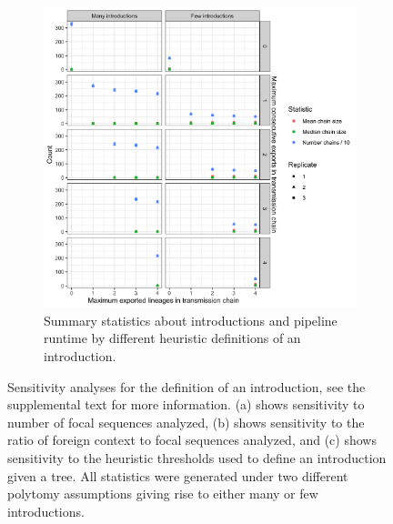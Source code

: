 \documentclass[9pt,twoside,lineno]{pnas-new}
\begin{document}
\begin{figure}[h!]
\begin{subfigure}[b]{0.9\textwidth}
\centering
\includegraphics[width = 11.4cm]{figures/fig_SX_sensitivity_chain_defn.png}
\caption{Summary statistics about introductions and pipeline runtime by different heuristic definitions of an introduction.}  
\end{subfigure}
\caption{Sensitivity analyses for the definition of an introduction, see the supplemental text for more information. (a) shows sensitivity to number of focal sequences analyzed, (b) shows sensitivity to the ratio of foreign context to focal sequences analyzed, and (c) shows sensitivity to the heuristic thresholds used to define an introduction given a tree. All statistics were generated under two different polytomy assumptions giving rise to either many or few introductions.}
\label{fig:sensitivity_figs}
\end{figure}
\end{document}
